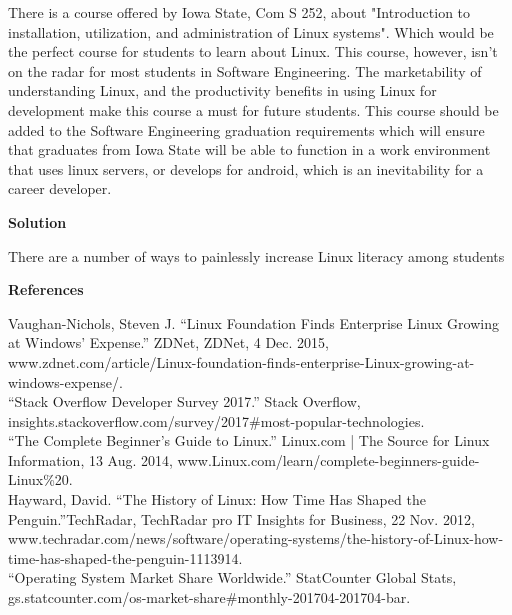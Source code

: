 \documentclass[11pt]{article}
\begin{document}
  \noindent There is a course offered by Iowa State, Com S 252, about "Introduction to installation, utilization, and administration of Linux systems". Which would be the perfect course
  for students to learn about Linux. This course, however, isn't on the radar for most students in Software Engineering. The marketability of understanding Linux, and the productivity benefits in using Linux for development
  make this course a must for future students. This course should be added to the Software Engineering graduation requirements which will ensure that graduates from Iowa State will be able to function
  in a work environment that uses linux servers, or develops for android, which is an inevitability for a career developer.

  \noindent\large{\textbf{Solution}}

  \noindent There are a number of ways to painlessly increase Linux literacy among students


  \clearpage

  \begin{center} \large{\textbf{References}} \end{center}

  \noindent Vaughan-Nichols, Steven J. “Linux Foundation Finds Enterprise Linux Growing at Windows' Expense.” ZDNet, ZDNet, 4 Dec. 2015,\\ www.zdnet.com/article/Linux-foundation-finds-enterprise-Linux-growing-at-windows-expense/.\\

  \noindent “Stack Overflow Developer Survey 2017.” Stack Overflow,\\ insights.stackoverflow.com/survey/2017\#most-popular-technologies.\\

  \noindent “The Complete Beginner's Guide to Linux.” Linux.com | The Source for Linux Information, 13 Aug. 2014, www.Linux.com/learn/complete-beginners-guide-Linux\%20.\\

  \noindent Hayward, David. “The History of Linux: How Time Has Shaped the Penguin.”TechRadar, TechRadar pro IT Insights for Business, 22 Nov. 2012,\\ www.techradar.com/news/software/operating-systems/the-history-of-Linux-how-time-has-shaped-the-penguin-1113914.\\

  \noindent “Operating System Market Share Worldwide.” StatCounter Global Stats,\\ gs.statcounter.com/os-market-share\#monthly-201704-201704-bar.
\end{document}
